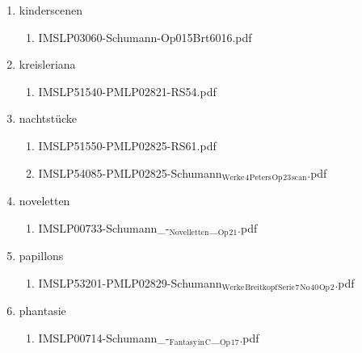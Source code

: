 \documentclass[11pt]{article}
\begin{document}
\begin{enumerate}
\begin{enumerate}
\item kinderscenen
\label{sec-1-1-1-1-44-61-5-6}
\begin{enumerate}
\item IMSLP03060-Schumann-Op015Brt6016.pdf
\label{sec-1-1-1-1-44-61-5-6-1}
\end{enumerate}

\item kreisleriana
\label{sec-1-1-1-1-44-61-5-7}
\begin{enumerate}
\item IMSLP51540-PMLP02821-RS54.pdf
\label{sec-1-1-1-1-44-61-5-7-1}
\end{enumerate}

\item nachtstücke
\label{sec-1-1-1-1-44-61-5-8}
\begin{enumerate}
\item IMSLP51550-PMLP02825-RS61.pdf
\label{sec-1-1-1-1-44-61-5-8-1}

\item IMSLP54085-PMLP02825-Schumann$_{\text{Werke}}$$_{\text{4}}$$_{\text{Peters}}$$_{\text{Op}}$$_{\text{23}}$$_{\text{scan}}$.pdf
\label{sec-1-1-1-1-44-61-5-8-2}
\end{enumerate}

\item noveletten
\label{sec-1-1-1-1-44-61-5-9}
\begin{enumerate}
\item IMSLP00733-Schumann\_-$_{\text{Novelletten}}$\_$_{\text{Op}}$$_{\text{21}}$.pdf
\label{sec-1-1-1-1-44-61-5-9-1}
\end{enumerate}

\item papillons
\label{sec-1-1-1-1-44-61-5-10}
\begin{enumerate}
\item IMSLP53201-PMLP02829-Schumann$_{\text{Werke}}$$_{\text{Breitkopf}}$$_{\text{Serie}}$$_{\text{7}}$$_{\text{No}}$$_{\text{40}}$$_{\text{Op}}$$_{\text{2}}$.pdf
\label{sec-1-1-1-1-44-61-5-10-1}
\end{enumerate}

\item phantasie
\label{sec-1-1-1-1-44-61-5-11}
\begin{enumerate}
\item IMSLP00714-Schumann\_-$_{\text{Fantasy}}$$_{\text{in}}$$_{\text{C}}$\_$_{\text{Op}}$$_{\text{17}}$.pdf
\label{sec-1-1-1-1-44-61-5-11-1}
\end{enumerate}


\end{enumerate}
\end{enumerate}
\end{document}
